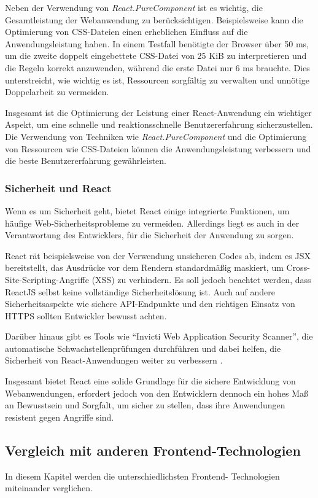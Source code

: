 Neben der Verwendung von \emph{React.PureComponent} ist es wichtig, die Gesamtleistung der Webanwendung zu berücksichtigen. Beispielsweise kann die Optimierung von CSS-Dateien einen erheblichen Einfluss auf die Anwendungsleistung haben. In einem Testfall benötigte der Browser über 50 ms, um die zweite doppelt eingebettete CSS-Datei von 25 KiB zu interpretieren und die Regeln korrekt anzuwenden, während die erste Datei nur 6 ms brauchte. Dies unterstreicht, wie wichtig es ist, Ressourcen sorgfältig zu verwalten und unnötige Doppelarbeit zu vermeiden. \cite{react-performance}

Insgesamt ist die Optimierung der Leistung einer React-Anwendung ein wichtiger Aspekt, um eine schnelle und reaktionsschnelle Benutzererfahrung sicherzustellen. Die Verwendung von Techniken wie \emph{React.PureComponent} und die Optimierung von Ressourcen wie CSS-Dateien können die Anwendungsleistung verbessern und die beste Benutzererfahrung gewährleisten. \cite{css-performance}


\subsubsection{Sicherheit und React}
Wenn es um Sicherheit geht, bietet React einige integrierte Funktionen, um häufige Web-Sicherheitsprobleme zu vermeiden. Allerdings liegt es auch in der Verantwortung des Entwicklers, für die Sicherheit der Anwendung zu sorgen.

React rät beispielsweise von der Verwendung unsicheren Codes ab, indem es JSX bereitstellt, das Ausdrücke vor dem Rendern standardmäßig maskiert, um Cross-Site-Scripting-Angriffe (XSS) zu verhindern. Es soll jedoch beachtet werden, dass ReactJS selbst keine vollständige Sicherheitslösung ist. Auch auf andere Sicherheitsaspekte wie sichere API-Endpunkte und den richtigen Einsatz von HTTPS sollten Entwickler bewusst achten.

Darüber hinaus gibt es Tools wie "`Invicti Web Application Security Scanner"', die automatische Schwachstellenprüfungen durchführen und dabei helfen, die Sicherheit von React-Anwendungen weiter zu verbessern \cite{geekflare_learning_resources} \cite{geekflare_rendering}.

Insgesamt bietet React eine solide Grundlage für die sichere Entwicklung von Webanwendungen, erfordert jedoch von den Entwicklern dennoch ein hohes Maß an Bewusstsein und Sorgfalt, um sicher zu stellen, dass ihre Anwendungen resistent gegen Angriffe sind.

\subsection{Vergleich mit anderen Frontend-Technologien}
In diesem Kapitel werden die unterschiedlichsten Frontend- Technologien miteinander verglichen.
